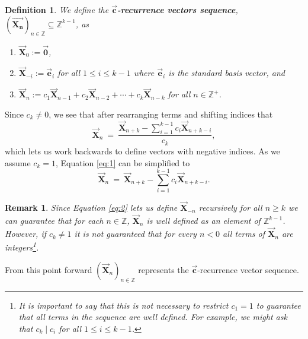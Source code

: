 \documentclass[]{interact}
\newcommand{\vtr}[1]{\vec{\mathbf{#1}}}
\theoremstyle{plain}
\numberwithin{equation}{section} %
\newtheorem{definition}[thm]{Definition}
\newtheorem{remark}[thm]{Remark}
\numberwithin{table}{section} %
\numberwithin{figure}{section}
\newcommand{\X}{\vtr{X}}
\begin{document}
\begin{definition}\label{Def: Rec Vectors}
    We define the \textbf{$\vtr{c}$-recurrence vectors sequence}, $(\vtr{X_n})_{n\in \mathbb{Z}} \subseteq \mathbb{Z}^{k-1}$,  as
    \begin{enumerate}
        \item[(1)] $\vtr{X}_0 := \vtr{0}$,
        \item[(2)] $\vtr{X}_{-i} := \vtr{e}_i$ for all $1 \leq i \leq k - 1$ where $\vtr{e}_i$ is the standard basis vector, and
        \item[(3)] $\X_n := c_1\X_{n - 1} + c_2\X_{n - 2} + \cdots + c_k\X_{n-k}$  for all  $n \in \mathbb{Z}^+$.
    \end{enumerate}
\end{definition}


Since $c_k \neq 0$, we see that after rearranging terms and shifting indices that
\begin{equation} \label{eq:1}
     \vtr{X}_n\ =\ \frac{\vtr{X}_{n+k} - \sum_{i =1}^{k - 1}c_i\vtr{X}_{n + k - i}}{c_k},
\end{equation} 
which lets us work backwards to define vectors with negative indices. As we assume $c_k = 1$, Equation \textcolor{blue}{\eqref{eq:1}} can be simplified to
\begin{equation} \label{eq:2}
     \vtr{\mathbf{X}}_n\ =\ \vtr{\mathbf{X}}_{n+k} - \sum_{i=1}^{k-1}c_i\vtr{\mathbf{X}}_{n+k-i}.
\end{equation} 

 \begin{remark}\label{rem: c_k=1}
     Since Equation \textcolor{blue}{\eqref{eq:2}} lets us define $\X_{-n}$ recursively for all $n \geq k$ we can guarantee that for each $n\in \mathbb{Z}$, $\vtr{X}_n$ is well defined as an element of $\mathbb{Z}^{k-1}$. However, if $c_k \neq 1$ it is not guaranteed that for every $n<0$ all terms of $\vtr{X}_{n}$ are integers\footnote{It is important to say that this is not necessary to restrict $c_1=1$ to guarantee that all terms in the sequence are well defined. For example, we might ask that $c_k \mid c_i$ for all $1\leq i \leq k-1$.}.
 \end{remark}

From this point forward $( \vtr{X}_n )_{ n \in \mathbb{Z}}$ represents the $\vtr{c}$-recurrence vector sequence.
\end{document}
